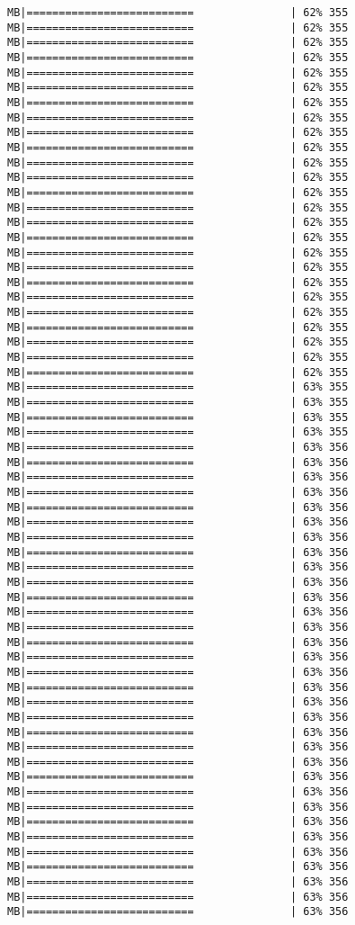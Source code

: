 \documentclass[
]{article}
\begin{document}
\begin{verbatim}
MB|==========================               | 62% 355 MB|==========================               | 62% 355 MB|==========================               | 62% 355 MB|==========================               | 62% 355 MB|==========================               | 62% 355 MB|==========================               | 62% 355 MB|==========================               | 62% 355 MB|==========================               | 62% 355 MB|==========================               | 62% 355 MB|==========================               | 62% 355 MB|==========================               | 62% 355 MB|==========================               | 62% 355 MB|==========================               | 62% 355 MB|==========================               | 62% 355 MB|==========================               | 62% 355 MB|==========================               | 62% 355 MB|==========================               | 62% 355 MB|==========================               | 62% 355 MB|==========================               | 62% 355 MB|==========================               | 62% 355 MB|==========================               | 62% 355 MB|==========================               | 62% 355 MB|==========================               | 62% 355 MB|==========================               | 62% 355 MB|==========================               | 62% 355 MB|==========================               | 63% 355 MB|==========================               | 63% 355 MB|==========================               | 63% 355 MB|==========================               | 63% 355 MB|==========================               | 63% 356 MB|==========================               | 63% 356 MB|==========================               | 63% 356 MB|==========================               | 63% 356 MB|==========================               | 63% 356 MB|==========================               | 63% 356 MB|==========================               | 63% 356 MB|==========================               | 63% 356 MB|==========================               | 63% 356 MB|==========================               | 63% 356 MB|==========================               | 63% 356 MB|==========================               | 63% 356 MB|==========================               | 63% 356 MB|==========================               | 63% 356 MB|==========================               | 63% 356 MB|==========================               | 63% 356 MB|==========================               | 63% 356 MB|==========================               | 63% 356 MB|==========================               | 63% 356 MB|==========================               | 63% 356 MB|==========================               | 63% 356 MB|==========================               | 63% 356 MB|==========================               | 63% 356 MB|==========================               | 63% 356 MB|==========================               | 63% 356 MB|==========================               | 63% 356 MB|==========================               | 63% 356 MB|==========================               | 63% 356 MB|==========================               | 63% 356 MB|==========================               | 63% 356 MB|==========================               | 63% 356 MB|==========================               | 63% 356 
\end{verbatim}
\end{document}
